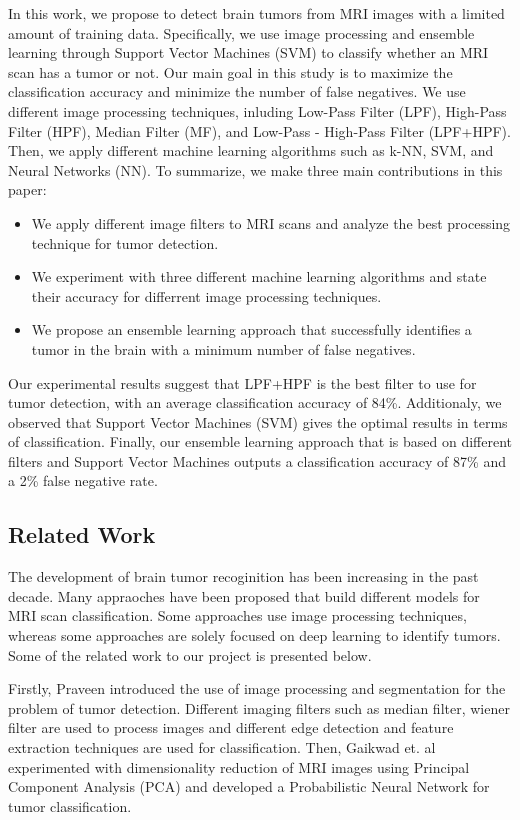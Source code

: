 \documentclass[conference]{IEEEtran}
\begin{document}
In this work, we propose to detect brain tumors from MRI images with a limited amount of training data. Specifically, we use image processing and ensemble learning through Support Vector Machines (SVM) to classify whether an MRI scan has a tumor or not. Our main goal in this study is to maximize the classification accuracy and minimize the number of false negatives. We use different image processing techniques, inluding Low-Pass Filter (LPF), High-Pass Filter (HPF), Median Filter (MF), and Low-Pass - High-Pass Filter (LPF+HPF). Then, we apply different machine learning algorithms such as k-NN, SVM, and Neural Networks (NN). To summarize, we make three main contributions in this paper:
\begin{itemize}
  \item We apply different image filters to MRI scans and analyze the best processing technique for tumor detection.
  \item We experiment with three different machine learning algorithms and state their accuracy for differrent image processing techniques.
  \item We propose an ensemble learning approach that successfully identifies a tumor in the brain with a minimum number of false negatives. 
\end{itemize}
Our experimental results suggest that LPF+HPF is the best filter to use for tumor detection, with an average classification accuracy of 84\%. Additionaly, we observed that Support Vector Machines (SVM) gives the optimal results in terms of classification. Finally, our ensemble learning approach that is based on different filters and Support Vector Machines outputs a classification accuracy of 87\% and a 2\% false negative rate. 

\subsection{Related Work} 
The development of brain tumor recoginition has been increasing in the past decade. Many appraoches have been proposed that build different models for MRI scan classification. Some approaches use image processing techniques, whereas some approaches are solely focused on deep learning to identify tumors. Some of the related work to our project is presented below. 

Firstly, Praveen \cite{b3} introduced the use of image processing and segmentation for the problem of tumor detection. Different imaging filters such as median filter, wiener filter are used to process images and different edge detection and feature extraction techniques are used for classification. Then, Gaikwad et. al \cite{b4} experimented with dimensionality reduction of MRI images using Principal Component Analysis (PCA) and developed a Probabilistic Neural Network for tumor classification. 
\end{document}
